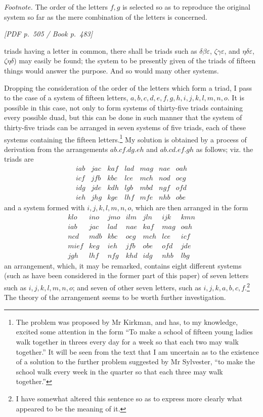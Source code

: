 \documentclass[11pt]{article}
\newcommand{\Page}[2]{\bigskip\noindent\textit{[PDF p.~#1 / Book p.~#2]}\par\smallskip}
\begin{document}
\smallskip
\noindent\textit{Footnote.} The order of the letters $f,g$ is selected so as to reproduce the
original system so far as the mere combination of the letters is concerned.

\Page{505}{483}

\noindent triads having a letter in common, there shall be triads such as
$\delta\beta\varepsilon$, $\zeta\gamma\varepsilon$, and $\eta\delta\varepsilon$,
$\zeta\eta\delta$) may easily be found; the system to be presently given of the
triads of fifteen things would answer the purpose. And so would many other systems.

Dropping the consideration of the order of the letters which form a triad, I pass to
the case of a system of fifteen letters, $a,b,c,d,e,f,g,h,i,j,k,l,m,n,o$. It is
possible in this case, not only to form systems of thirty-five triads containing every
possible duad, but this can be done in such manner that the system of thirty-five
triads can be arranged in seven systems of five triads, each of these systems containing
the fifteen letters.\footnote{The problem was proposed by Mr Kirkman, and has, to my
knowledge, excited some attention in the form ``To make a school of fifteen young
ladies walk together in threes every day for a week so that each two may walk
together.'' It will be seen from the text that I am uncertain as to the existence of a
solution to the further problem suggested by Mr Sylvester, ``to make the school walk
every week in the quarter so that each three may walk together.''} My solution is
obtained by a process of derivation from the arrangements $ab.cf.dg.eh$ and
$ab.cd.ef.gh$ as follows; viz. the triads are
\[
\begin{array}{rrrrrrr}
iab&jac&kaf&lad&mag&nae&oah\\
icf&jfb&kbc&lce&mch&nod&ocg\\
idg&jde&kdh&lgb&mbd&ngf&ofd\\
ieh&jhg&kge&lhf&mfe&nhb&obe
\end{array}
\]
and a system formed with $i,j,k,l,m,n,o$, which are then arranged in the form
\[
\begin{array}{rrrrrrr}
klo&ino&jmo&ilm&jln&ijk&kmn\\
iab&jac&lad&nae&kaf&mag&oah\\
ncd&mdb&kbc&ocg&mch&lce&icf\\
mief&keg&ieh&jfb&obe&ofd&jde\\
jgh&lhf&nfg&khd&idg&nhb&lbg
\end{array}
\]
an arrangement, which, it may be remarked, contains eight different systems (such as
have been considered in the former part of this paper) of seven letters such as
$i,j,k,l,m,n,o$; and seven of other seven letters, such as $i,j,k,a,b,c,f$.\footnote{I
have somewhat altered this sentence so as to express more clearly what appeared to be
the meaning of it.} The theory of the arrangement seems to be worth further
investigation.
\end{document}
